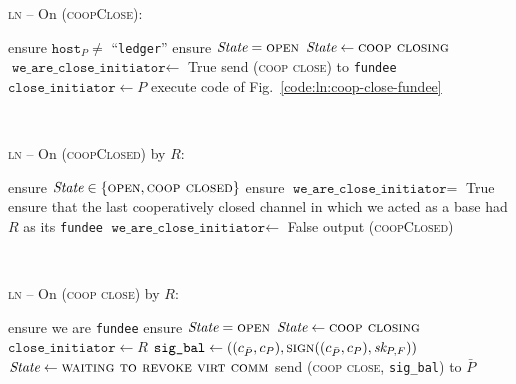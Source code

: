 \begin{center}
  \begin{processbox}{\textsc{ln} -- On (\textsc{coopClose}):}
    \begin{algorithmic}[1]
      \State ensure $\texttt{host}_P \neq$ ``\texttt{ledger}''
      \State ensure $\itistate = \textsc{open}$
      \State $\itistate \gets \textsc{coop closing}$
        \State $\texttt{we\_are\_close\_initiator} \gets$ True
        \State send (\textsc{coop close}) to \texttt{fundee}
      \Else \: 
        \State $\texttt{close\_initiator} \gets P$
        \State execute code of Fig.~\ref{code:ln:coop-close-fundee}
        \label{code:ln:coop-close:goto}
      \EndIf
    \end{algorithmic}
  \end{processbox}
  \label{code:ln:coop-close}
\end{center} \ \\

\begin{center}
  \begin{processbox}{\textsc{ln} -- On (\textsc{coopClosed}) by $R$:}
    \begin{algorithmic}[1]
      \State ensure $\itistate \in \{\textsc{open}, \textsc{coop closed}\}$
      \State ensure $\texttt{we\_are\_close\_initiator} =$ True
      \State ensure that the last cooperatively closed channel in which we acted
      as a base had $R$ as its \texttt{fundee}
      \State $\texttt{we\_are\_close\_initiator} \gets$ False
      \State output (\textsc{coopClosed})
    \end{algorithmic}
  \end{processbox}
  \label{code:ln:coop-closed-to-initiator}
\end{center} \ \\

\begin{center}
  \begin{processbox}{\textsc{ln} -- On (\textsc{coop close}) by $R$:}
    \begin{algorithmic}[1]
      \State ensure we are \texttt{fundee}
      \State ensure $\itistate = \textsc{open}$
      \State $\itistate \gets \textsc{coop closing}$
      \State $\texttt{close\_initiator} \gets R$
      \State $\texttt{sig\_bal} \gets ((c_{\bar{P}}, c_P),
      \textsc{sign}((c_{\bar{P}}, c_P), \textit{sk}_{P, F}))$
      \State $\itistate \gets \textsc{waiting to revoke virt comm}$
      \State send (\textsc{coop close}, \texttt{sig\_bal}) to $\bar{P}$
    \end{algorithmic}
  \end{processbox}
  \label{code:ln:coop-close-fundee}
\end{center} \ \\

